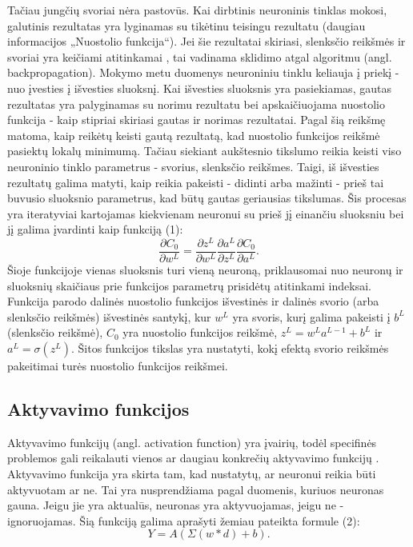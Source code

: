 \documentclass{VUMIFPSbakalaurinis}
\begin{document}
Tačiau jungčių svoriai nėra pastovūs. Kai dirbtinis neuroninis tinklas mokosi, galutinis rezultatas yra lyginamas su tikėtinu teisingu rezultatu (daugiau informacijos „Nuostolio funkcija“). Jei šie
rezultatai skiriasi, slenksčio reikšmės ir svoriai yra keičiami atitinkamai \cite{backpropogation}, tai vadinama sklidimo atgal algoritmu (angl. backpropagation).
Mokymo metu duomenys neuroniniu tinklu keliauja į priekį - nuo įvesties į išvesties sluoksnį. Kai išvesties sluoksnis yra pasiekiamas, gautas rezultatas yra palyginamas su norimu rezultatu bei 
apskaičiuojama nuostolio funkcija - kaip stipriai skiriasi gautas ir norimas rezultatai. Pagal šią reikšmę matoma, kaip reikėtų keisti gautą rezultatą, kad nuostolio funkcijos reikšmė pasiektų lokalų 
minimumą. Tačiau siekiant aukštesnio tikslumo reikia keisti viso neuroninio tinklo parametrus - svorius, slenksčio reikšmes. Taigi, iš išvesties rezultatų galima matyti, kaip reikia pakeisti - 
didinti arba mažinti - prieš tai buvusio sluoksnio parametrus, kad būtų gautas geriausias tikslumas. Šis procesas yra iteratyviai kartojamas kiekvienam neuronui su prieš jį einančiu sluoksniu bei jį galima įvardinti kaip funkciją (1):
\begin{equation}
\frac{\partial{C_{0}}}{\partial{w^{L}}} = \frac{\partial{z^{L}}}{\partial{w^{L}}} \frac{\partial{a^{L}}}{\partial{z^{L}}} \frac{\partial{C_{0}}}{\partial{a^{L}}}.
\end{equation}
Šioje funkcijoje vienas sluoksnis turi vieną neuroną, priklausomai nuo neuronų ir sluoksnių skaičiaus prie funkcijos parametrų prisidėtų atitinkami indeksai. Funkcija parodo dalinės nuostolio funkcijos 
išvestinės ir dalinės svorio (arba slenksčio reikšmės) išvestinės santykį, kur \(w^{L}\) yra svoris, kurį galima pakeisti į \(b^{L}\) (slenksčio reikšmė), \(C_{0}\) yra nuostolio funkcijos reikšmė, 
\(z^{L} = w^{L}a^{L-1}+b^{L}\) ir \(a^{L}=\sigma(z^{L})\). Šitos funkcijos tikslas yra nustatyti, kokį efektą svorio reikšmės pakeitimai turės nuostolio funkcijos reikšmei.

\subsection{Aktyvavimo funkcijos}
Aktyvavimo funkcijų (angl. activation function) yra įvairių, todėl specifinės problemos gali reikalauti vienos ar daugiau konkrečių aktyvavimo funkcijų \cite{activation}.
Aktyvavimo funkcija yra skirta tam, kad nustatytų, ar neuronui reikia būti aktyvuotam ar ne. Tai yra nusprendžiama pagal duomenis, kuriuos neuronas gauna. Jeigu jie yra aktualūs, neuronas yra aktyvuojamas, jeigu ne - ignoruojamas.
Šią funkciją galima aprašyti žemiau pateikta formule (2):
\begin{equation}
Y = A(\Sigma{(w * d) + b}).
\end{equation}
\end{document}
